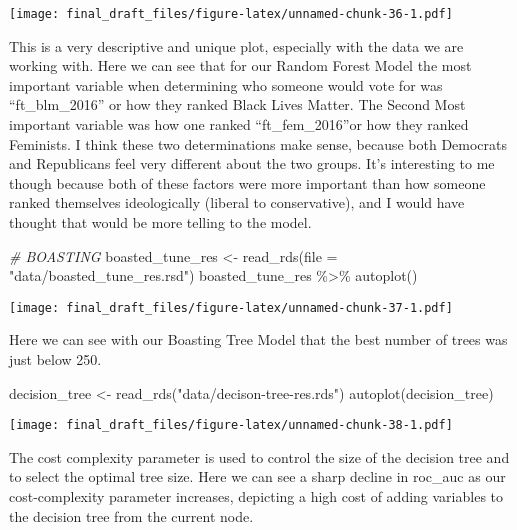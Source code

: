 \documentclass[
]{article}
\newenvironment{Shaded}{\begin{snugshade}}{\end{snugshade}}
\newcommand{\AttributeTok}[1]{\textcolor[rgb]{0.77,0.63,0.00}{#1}}
\newcommand{\CommentTok}[1]{\textcolor[rgb]{0.56,0.35,0.01}{\textit{#1}}}
\newcommand{\FunctionTok}[1]{\textcolor[rgb]{0.00,0.00,0.00}{#1}}
\newcommand{\NormalTok}[1]{#1}
\newcommand{\OtherTok}[1]{\textcolor[rgb]{0.56,0.35,0.01}{#1}}
\newcommand{\SpecialCharTok}[1]{\textcolor[rgb]{0.00,0.00,0.00}{#1}}
\newcommand{\StringTok}[1]{\textcolor[rgb]{0.31,0.60,0.02}{#1}}
\begin{document}
\texttt{[image: final\_draft\_files/figure-latex/unnamed-chunk-36-1.pdf]}

This is a very descriptive and unique plot, especially with the data we
are working with. Here we can see that for our Random Forest Model the
most important variable when determining who someone would vote for was
``ft\_blm\_2016'' or how they ranked Black Lives Matter. The Second Most
important variable was how one ranked ``ft\_fem\_2016''or how they
ranked Feminists. I think these two determinations make sense, because
both Democrats and Republicans feel very different about the two groups.
It's interesting to me though because both of these factors were more
important than how someone ranked themselves ideologically (liberal to
conservative), and I would have thought that would be more telling to
the model.

\begin{Shaded}
\begin{Highlighting}[]
\CommentTok{\# BOASTING}
\NormalTok{boasted\_tune\_res }\OtherTok{\textless{}{-}} \FunctionTok{read\_rds}\NormalTok{(}\AttributeTok{file =} \StringTok{"data/boasted\_tune\_res.rsd"}\NormalTok{)}
\NormalTok{boasted\_tune\_res }\SpecialCharTok{\%\textgreater{}\%}
  \FunctionTok{autoplot}\NormalTok{()}
\end{Highlighting}
\end{Shaded}

\texttt{[image: final\_draft\_files/figure-latex/unnamed-chunk-37-1.pdf]}

Here we can see with our Boasting Tree Model that the best number of
trees was just below 250.

\begin{Shaded}
\begin{Highlighting}[]
\NormalTok{decision\_tree }\OtherTok{\textless{}{-}} \FunctionTok{read\_rds}\NormalTok{(}\StringTok{"data/decison{-}tree{-}res.rds"}\NormalTok{)}
\FunctionTok{autoplot}\NormalTok{(decision\_tree)}
\end{Highlighting}
\end{Shaded}

\texttt{[image: final\_draft\_files/figure-latex/unnamed-chunk-38-1.pdf]}

The cost complexity parameter is used to control the size of the
decision tree and to select the optimal tree size. Here we can see a
sharp decline in roc\_auc as our cost-complexity parameter increases,
depicting a high cost of adding variables to the decision tree from the
current node.
\end{document}
